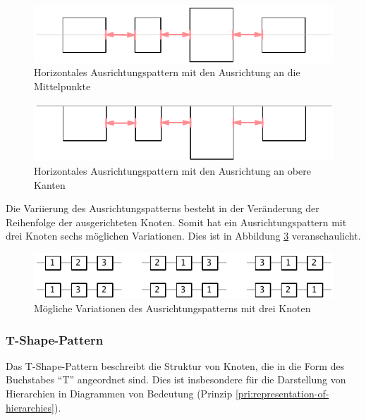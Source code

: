 \begin{figure}[hbt]
    \centering
    \includegraphics{resources/layout-pattern-alignment-center}
    \caption{Horizontales Ausrichtungspattern mit den Ausrichtung an die Mittelpunkte}
    \label{fig:layout-pattern-alignment-center}
\end{figure}

\begin{figure}[hbt]
    \centering
    \includegraphics{resources/layout-pattern-alignment-top}
    \caption{Horizontales Ausrichtungspattern mit den Ausrichtung an obere Kanten}
    \label{fig:layout-pattern-alignment-top}
\end{figure}

Die Variierung des Ausrichtungspatterns besteht in der Veränderung der Reihenfolge der ausgerichteten Knoten. Somit hat ein Ausrichtungspattern mit drei Knoten sechs möglichen Variationen. Dies ist in Abbildung \ref{fig:layout-pattern-alignment-variations} veranschaulicht.

\begin{figure}[hbt]
    \centering
    \includegraphics[scale=1.3]{resources/layout-pattern-alignment-variations}
    \caption{Mögliche Variationen des Ausrichtungspatterns mit drei Knoten}
    \label{fig:layout-pattern-alignment-variations}
\end{figure}

\subsubsection{T-Shape-Pattern}
\label{subsubsec:t-shape-pattern}

Das T-Shape-Pattern beschreibt die Struktur von Knoten, die in die Form des Buchstabes \enquote{T} angeordnet sind. Dies ist insbesondere für die Darstellung von Hierarchien in Diagrammen von Bedeutung (Prinzip \ref{pri:representation-of-hierarchies}).

